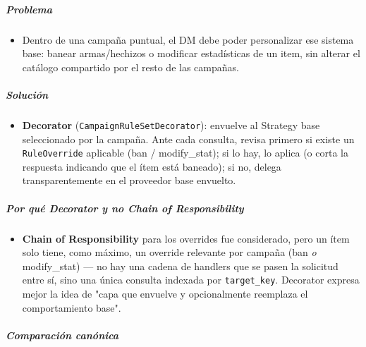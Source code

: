 \subparagraph{Problema}
\begin{itemize}[itemsep=2pt,topsep=2pt]
\item Dentro de una campaña puntual, el DM debe poder personalizar ese sistema base: banear armas/hechizos o modificar estadísticas de un item, sin alterar el catálogo compartido por el resto de las campañas.
\end{itemize}
\subparagraph{Solución}
\begin{itemize}[itemsep=2pt,topsep=2pt]
\item \textbf{Decorator} (\texttt{CampaignRuleSetDecorator}): envuelve al Strategy base seleccionado por la campaña. Ante cada consulta, revisa primero si existe un \texttt{RuleOverride} aplicable (ban / modify\_stat); si lo hay, lo aplica (o corta la respuesta indicando que el ítem está baneado); si no, delega transparentemente en el proveedor base envuelto.
\end{itemize}
\subparagraph{Por qué Decorator y no Chain of Responsibility}
\begin{itemize}[itemsep=2pt,topsep=2pt]
\item \textbf{Chain of Responsibility} para los overrides fue considerado, pero un ítem solo tiene, como máximo, un override relevante por campaña (ban \textit{o} modify\_stat) — no hay una cadena de handlers que se pasen la solicitud entre sí, sino una única consulta indexada por \texttt{target\_\allowbreak{}key}. Decorator expresa mejor la idea de "capa que envuelve y opcionalmente reemplaza el comportamiento base".
\end{itemize}
\subparagraph{Comparación canónica}
